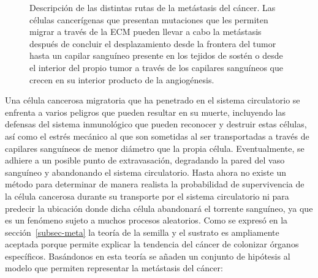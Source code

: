 \begin{figure}[!ht]
\begin{center}
\end{center}\vspace*{-0.6cm}
\caption[Descripci\'on de las distintas rutas de la met\'astasis del c\'ancer]{Descripci\'on de las distintas rutas de la met\'astasis del c\'ancer. Las c\'elulas cancer\'igenas que presentan mutaciones que les permiten migrar a trav\'es de la ECM pueden llevar a cabo la met\'astasis despu\'es de concluir el desplazamiento desde la frontera del tumor hasta un capilar sangu\'ineo presente en los tejidos de sost\'en o desde el interior del propio tumor a trav\'es de los capilares sangu\'ineos que crecen en su interior producto de la angiog\'enesis.}
\label{fig-metastasis-vias}
\end{figure}

Una célula cancerosa migratoria que ha penetrado en el sistema circulatorio se enfrenta a varios peligros que pueden resultar en su muerte, incluyendo las defensas del sistema inmunológico que pueden reconocer y destruir estas células, así como el estrés mecánico al que son sometidas al ser transportadas a través de capilares sanguíneos de menor diámetro que la propia célula. Eventualmente, se adhiere a un posible punto de extravasación, degradando la pared del vaso sanguíneo y abandonando el sistema circulatorio. Hasta ahora no existe un método para determinar de manera realista la probabilidad de supervivencia de la célula cancerosa durante su transporte por el sistema circulatorio ni para predecir la ubicación donde dicha célula abandonará el torrente sanguíneo, ya que es un fenómeno sujeto a muchos procesos aleatorios. Como se expres\'o en la secci\'on~\ref{subsec-meta} la teor\'ia de la semilla y el sustrato es ampliamente aceptada porque permite explicar la tendencia del c\'ancer de colonizar \'organos espec\'ificos. Bas\'andonos en esta teor\'ia se a\~naden un conjunto de hip\'otesis al modelo que permiten representar la met\'astasis del c\'ancer:

